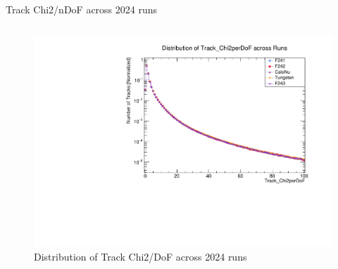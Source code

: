 \begin{frame}{Track Chi2/nDoF across 2024 runs}
\begin{columns}
\begin{column}{0.5 \linewidth}
			\begin{figure}
				\includegraphics[width=\linewidth]{./RunwisePlots/Track_Chi2perDoF_runwise.pdf}
				\caption{Distribution of Track Chi2/DoF across 2024 runs}
			\end{figure}
		\end{column}
	\end{columns}
\end{frame}



	
